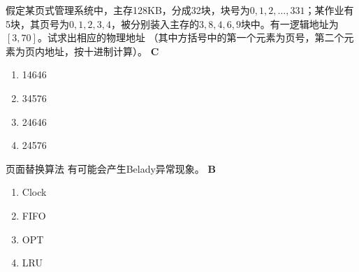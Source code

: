 \begin{problem}
	假定某页式管理系统中，主存128KB，分成32块，块号为$0,1,2,\dots,331$；某作业有5块，其页号为$0,1,2,3,4$，被分别装入主存的$3,8,4,6,9$块中。有一逻辑地址为$[3,70]$。试求出相应的物理地址 \myline （其中方括号中的第一个元素为页号，第二个元素为页内地址，按十进制计算）。
	\textbf{C}
	\vspace{-0.5em}
	\begin{multicols}{4}
		\begin{enumerate}[label=\Alph*.]
			\item 14646
			\item 34576
			\item 24646
			\item 24576
		\end{enumerate}
	\end{multicols}
	\vspace{-1em}
\end{problem}


\begin{problem}
	页面替换算法 \myline 有可能会产生Belady异常现象。
	\textbf{B}
	\vspace{-0.5em}
	\begin{multicols}{4}
		\begin{enumerate}[label=\Alph*.]
			\item Clock
			\item FIFO
			\item OPT
			\item LRU
		\end{enumerate}
	\end{multicols}
	\vspace{-1em}
\end{problem}